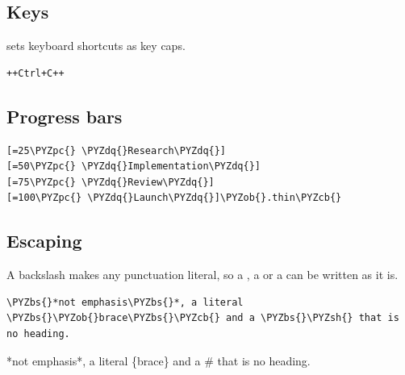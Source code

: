 \documentclass[a4paper,twoside]{article}
\begin{document}
\subsection{Keys}
 sets keyboard shortcuts as key caps.
\begin{tscode}[lang=md, engine=pygments]
\begin{Verbatim}[commandchars=\\\{\},breaklines, breakanywhere, commandchars=\\\{\}]
++Ctrl+C++
\end{Verbatim}
\end{tscode}
\begin{displayquote}
\end{displayquote}
\subsection{Progress bars}
\begin{tscode}[lang=markdown, engine=pygments]
\begin{Verbatim}[commandchars=\\\{\},breaklines, breakanywhere, commandchars=\\\{\}]
[=25\PYZpc{} \PYZdq{}Research\PYZdq{}]
[=50\PYZpc{} \PYZdq{}Implementation\PYZdq{}]
[=75\PYZpc{} \PYZdq{}Review\PYZdq{}]
[=100\PYZpc{} \PYZdq{}Launch\PYZdq{}]\PYZob{}.thin\PYZcb{}
\end{Verbatim}
\end{tscode}
\subsection{Escaping}
A backslash makes any punctuation literal, so a \tscodeinline{*}, a \tscodeinline{\_} or a \tscodeinline{\{} can be written as it is.
\begin{tscode}[lang=md, engine=pygments]
\begin{Verbatim}[commandchars=\\\{\},breaklines, breakanywhere, commandchars=\\\{\}]
\PYZbs{}*not emphasis\PYZbs{}*, a literal \PYZbs{}\PYZob{}brace\PYZbs{}\PYZcb{} and a \PYZbs{}\PYZsh{} that is no heading.
\end{Verbatim}
\end{tscode}
\begin{displayquote}
*not emphasis*, a literal \{brace\} and a \# that is no heading.
\end{displayquote}
\end{document}
